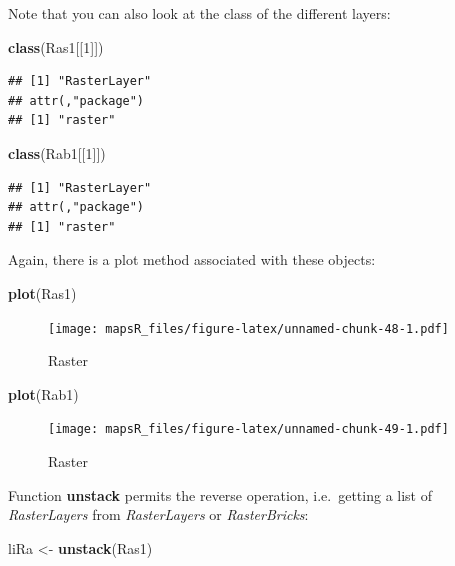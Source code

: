 \documentclass[]{report}
\newenvironment{Shaded}{\begin{snugshade}}{\end{snugshade}}
\newcommand{\DecValTok}[1]{\textcolor[rgb]{0.00,0.00,0.81}{#1}}
\newcommand{\KeywordTok}[1]{\textcolor[rgb]{0.13,0.29,0.53}{\textbf{#1}}}
\newcommand{\NormalTok}[1]{#1}
\newcommand{\StringTok}[1]{\textcolor[rgb]{0.31,0.60,0.02}{#1}}
\begin{document}
Note that you can also look at the class of the different layers:

\begin{Shaded}
\begin{Highlighting}[]
\KeywordTok{class}\NormalTok{(Ras1[[}\DecValTok{1}\NormalTok{]])}
\end{Highlighting}
\end{Shaded}

\begin{verbatim}
## [1] "RasterLayer"
## attr(,"package")
## [1] "raster"
\end{verbatim}

\begin{Shaded}
\begin{Highlighting}[]
\KeywordTok{class}\NormalTok{(Rab1[[}\DecValTok{1}\NormalTok{]])}
\end{Highlighting}
\end{Shaded}

\begin{verbatim}
## [1] "RasterLayer"
## attr(,"package")
## [1] "raster"
\end{verbatim}

Again, there is a plot method associated with these objects:

\begin{Shaded}
\begin{Highlighting}[]
\KeywordTok{plot}\NormalTok{(Ras1)}
\end{Highlighting}
\end{Shaded}

\begin{figure}
\centering
\texttt{[image: mapsR\_files/figure-latex/unnamed-chunk-48-1.pdf]}
\caption{Raster}
\end{figure}

\begin{Shaded}
\begin{Highlighting}[]
\KeywordTok{plot}\NormalTok{(Rab1)}
\end{Highlighting}
\end{Shaded}

\begin{figure}
\centering
\texttt{[image: mapsR\_files/figure-latex/unnamed-chunk-49-1.pdf]}
\caption{Raster}
\end{figure}

Function \textbf{unstack} permits the reverse operation, i.e.~getting a
list of \emph{RasterLayers} from \emph{RasterLayers} or
\emph{RasterBricks}:

\begin{Shaded}
\begin{Highlighting}[]
\NormalTok{liRa <-}\StringTok{ }\KeywordTok{unstack}\NormalTok{(Ras1)}
\end{Highlighting}
\end{Shaded}
\end{document}

